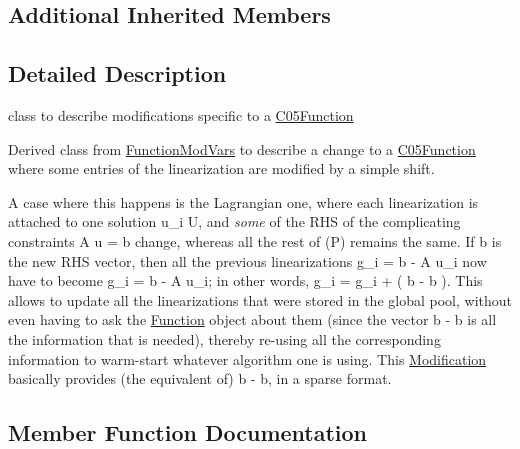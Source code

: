 \subsection*{Additional Inherited Members}


\subsection{Detailed Description}
class to describe modifications specific to a \mbox{\hyperlink{class_s_m_spp__di__unipi__it_1_1_c05_function}{C05\+Function}} 

Derived class from \mbox{\hyperlink{class_s_m_spp__di__unipi__it_1_1_function_mod_vars}{Function\+Mod\+Vars}} to describe a change to a \mbox{\hyperlink{class_s_m_spp__di__unipi__it_1_1_c05_function}{C05\+Function}} where some entries of the linearization are modified by a simple shift.

A case where this happens is the Lagrangian one, where each linearization is attached to one solution u\+\_\+i  U, and {\itshape some} of the R\+HS of the complicating constraints A u = b change, whereas all the rest of (P) remains the same. If b\textquotesingle{} is the new R\+HS vector, then all the previous linearizations g\+\_\+i = b -\/ A u\+\_\+i now have to become g\textquotesingle{}\+\_\+i = b\textquotesingle{} -\/ A u\+\_\+i; in other words, g\textquotesingle{}\+\_\+i = g\+\_\+i + ( b\textquotesingle{} -\/ b ). This allows to update all the linearizations that were stored in the global pool, without even having to ask the \mbox{\hyperlink{class_s_m_spp__di__unipi__it_1_1_function}{Function}} object about them (since the vector b\textquotesingle{} -\/ b is all the information that is needed), thereby re-\/using all the corresponding information to warm-\/start whatever algorithm one is using. This \mbox{\hyperlink{class_s_m_spp__di__unipi__it_1_1_modification}{Modification}} basically provides (the equivalent of) b\textquotesingle{} -\/ b, in a sparse format. 

\subsection{Member Function Documentation}
\mbox{\label{class_s_m_spp__di__unipi__it_1_1_c05_function_mod_shift_a8788457eb4fee71415bf9750f650bfc6}} 

